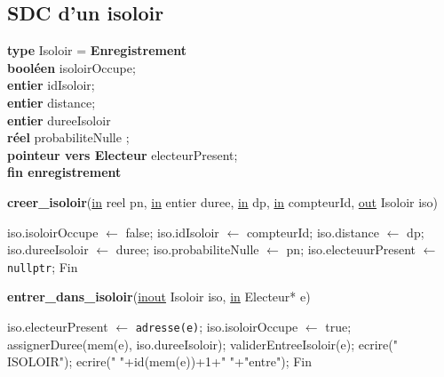 \documentclass[12pt]{article} %
\begin{document}
\newpage

\subsection*{SDC d'un isoloir}

\begin{flushleft}
		\textbf{type} Isoloir = \textbf{Enregistrement}\\
		\hspace*{1em} \textbf{booléen} isoloirOccupe;\\
		\hspace*{1em} \textbf{entier} idIsoloir;\\
		\hspace*{1em} \textbf{entier} distance;\\
		\hspace*{1em} \textbf{entier} dureeIsoloir\\
		\hspace*{1em} \textbf{réel} probabiliteNulle ;\\
		\hspace*{1em} \textbf{pointeur vers Electeur} electeurPresent;\\
		\textbf{fin enregistrement}
\end{flushleft}



\begin{algorithm}
	\caption{\textbf{creer\_isoloir}(\underline{in} reel pn, \underline{in} entier duree, \underline{in} dp, \underline{in} compteurId, \underline{out} Isoloir iso)}
	\begin{algorithmic}[1]
		\Start
		\State iso.isoloirOccupe $\leftarrow$ false;
		\State iso.idIsoloir $\leftarrow$ compteurId;
		\State iso.distance $\leftarrow$ dp; 
		\State iso.dureeIsoloir $\leftarrow$ duree;
		\State iso.probabiliteNulle $\leftarrow$ pn;
		\State iso.electeuurPresent $\leftarrow$ \texttt{nullptr};
		\State Fin
	\end{algorithmic}
\end{algorithm}

\begin{algorithm}
	\caption{\textbf{entrer\_dans\_isoloir}(\underline{inout} Isoloir iso, \underline{in} Electeur* e)}
	\begin{algorithmic}[1]
		\Start
		\State iso.electeurPresent $\leftarrow$ \texttt{adresse(e)};
		\State iso.isoloirOccupe $\leftarrow$ true;
		\State assignerDuree(mem(e), iso.dureeIsoloir); 
		\State validerEntreeIsoloir(e);
		\State ecrire("   ISOLOIR");
		\State ecrire("      "+id(mem(e))+1+" "+"entre");
		\State Fin
	\end{algorithmic}
	\end{algorithm}
	
\end{document}
